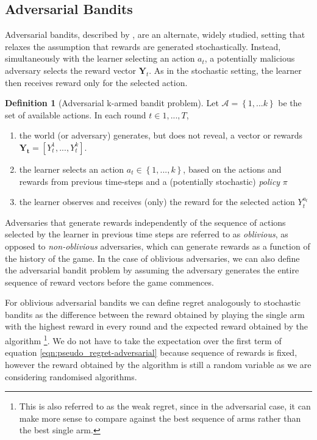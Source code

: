 \documentclass[11pt,a4paper,oneside]{book}
\newcommand{\actionspace}{\mathcal{A}}
\newcommand{\set}[1]{\left\{#1\right\}}
\newcommand{\cfb}[2]{{#1}_t^{#2}} %
\renewcommand{\vec}[1]{\boldsymbol{#1}}
\theoremstyle{plain}
\theoremstyle{definition}
\newtheorem{definition}[theorem]{Definition}
\begin{document}
\subsection{Adversarial Bandits}

Adversarial bandits, described by \citet{Auer1995}, are an alternate, widely studied, setting that relaxes the assumption that rewards are generated stochastically. Instead, simultaneously with the learner selecting an action $a_t$, a potentially malicious adversary selects the reward vector $\boldsymbol{Y}_t$. As in the stochastic setting, the learner then receives reward only for the selected action. 

\vspace{0.5cm}
\begin{definition}[Adversarial k-armed bandit problem]
\label{def:adversarial-k-armed-bandit}
Let $\actionspace = \set{1,...k}$ be the set of available actions.  In each round $t \in 1,...,T$, 
\begin{enumerate}
\item the world (or adversary) generates, but does not reveal, a vector or rewards $\vec{Y_t}=[\cfb{Y}{1},...,\cfb{Y}{k}]$. 
\item the learner selects an action $a_{t} \in \set{1,...,k}$, based on the actions and rewards from previous time-steps and a (potentially stochastic) \emph{policy} $\pi$
\item the learner observes and receives (only) the reward for the selected action $\cfb{Y}{a_t}$ 
\end{enumerate} 
\end{definition}

Adversaries that generate rewards independently of the sequence of actions selected by the learner in previous time steps are referred to as \emph{oblivious}, as opposed to \emph{non-oblivious} adversaries, which can generate rewards as a function of the history of the game. In the case of oblivious adversaries, we can also define the adversarial bandit problem by assuming the adversary generates the entire sequence of reward vectors before the game commences. 

For oblivious adversarial bandits we can define regret analogously to stochastic bandits as the difference between the reward obtained by playing the single arm with the highest reward in every round and the expected reward obtained by the algorithm \footnote{This is also referred to as the weak regret, since in the adversarial case, it can make more sense to compare against the best sequence of arms rather than the best single arm.}. We do not have to take the expectation over the first term of equation \ref{eqn:pseudo_regret-adversarial} because sequence of rewards is fixed, however the reward obtained by the algorithm is still a random variable as we are considering randomised algorithms.  
\end{document}
